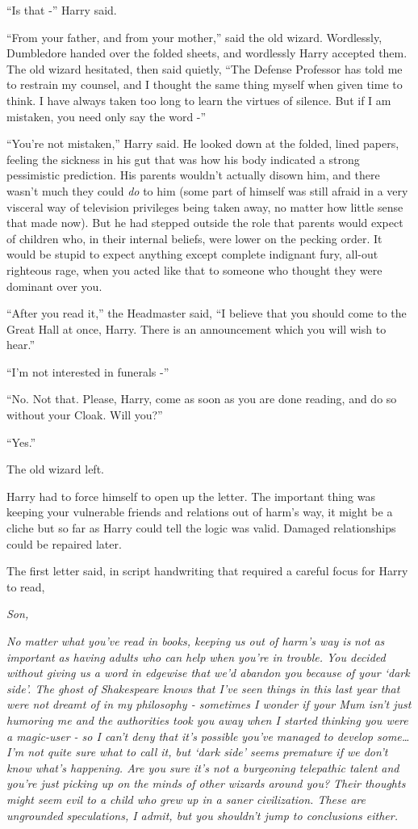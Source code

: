 ``Is that -'' Harry said.

``From your father, and from your mother,'' said the old wizard.
Wordlessly, Dumbledore handed over the folded sheets, and wordlessly
Harry accepted them. The old wizard hesitated, then said quietly, ``The
Defense Professor has told me to restrain my counsel, and I thought the
same thing myself when given time to think. I have always taken too long
to learn the virtues of silence. But if I am mistaken, you need only say
the word -''

``You're not mistaken,'' Harry said. He looked down at the folded, lined
papers, feeling the sickness in his gut that was how his body indicated
a strong pessimistic prediction. His parents wouldn't actually disown
him, and there wasn't much they could \emph{do} to him (some part of
himself was still afraid in a very visceral way of television privileges
being taken away, no matter how little sense that made now). But he had
stepped outside the role that parents would expect of children who, in
their internal beliefs, were lower on the pecking order. It would be
stupid to expect anything except complete indignant fury, all-out
righteous rage, when you acted like that to someone who thought they
were dominant over you.

``After you read it,'' the Headmaster said, ``I believe that you should
come to the Great Hall at once, Harry. There is an announcement which
you will wish to hear.''

``I'm not interested in funerals -''

``No. Not that. Please, Harry, come as soon as you are done reading, and
do so without your Cloak. Will you?''

``Yes.''

The old wizard left.

Harry had to force himself to open up the letter. The important thing
was keeping your vulnerable friends and relations out of harm's way, it
might be a cliche but so far as Harry could tell the logic was valid.
Damaged relationships could be repaired later.

The first letter said, in script handwriting that required a careful
focus for Harry to read,

\emph{Son,}

\emph{No matter what you've read in books, keeping us out of harm's way
is} \emph{not} \emph{as important as having adults who can help when
you're in trouble. You decided without giving us a word in edgewise that
we'd abandon you because of your `dark side'. The ghost of Shakespeare
knows that I've seen things in this last year that were not dreamt of in
my philosophy - sometimes I wonder if your Mum isn't just humoring me
and the authorities took you away when I started thinking you were a
magic-user - so I can't deny that it's} \emph{possible} \emph{you've
managed to develop some\ldots{} I'm not quite sure what to call it, but
`dark side' seems premature if we don't know what's happening. Are you
sure it's not a burgeoning telepathic talent and you're just picking up
on the minds of other wizards around you? Their thoughts might seem evil
to a child who grew up in a saner civilization. These are ungrounded
speculations, I admit, but you shouldn't jump to conclusions either.}

